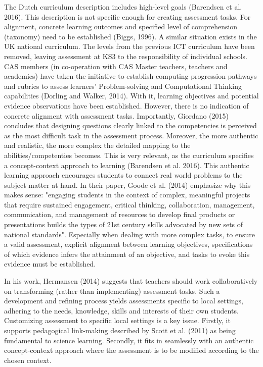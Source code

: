 The Dutch curriculum description includes high-level goals (Barendsen et al. 2016). This description is not specific enough for creating assessment tasks. For alignment, concrete learning outcomes and specified level of comprehension (taxonomy) need to be established (Biggs, 1996). A similar situation exists in the UK national curriculum. The levels from the previous ICT curriculum have been removed, leaving assessment at KS3 to the responsibility of individual schools. CAS members (in co-operation with CAS Master teachers, teachers and academics) have taken the initiative to establish computing progression pathways and rubrics to assess learners' Problem-solving and Computational Thinking capabilities (Dorling and Walker, 2014). With it, learning objectives and potential evidence observations have been established. However, there is no indication of concrete alignment with assessment tasks. Importantly, Giordano (2015) concludes that designing questions clearly linked to the competencies is perceived as the most difficult task in the assessment process. Moreover, the more authentic and realistic, the more complex the detailed mapping to the abilities/competenties becomes. This is very relevant, as the curriculum specifies a concept-context approach to learning (Barendsen et al. 2016). This authentic learning approach encourages students to connect real world problems to the subject matter at hand. In their paper, Goode et al. (2014) emphasize why this makes sense: "engaging students in the context of complex, meaningful projects that require sustained engagement, critical thinking, collaboration, management, communication, and management of resources to develop final products or presentations builds the types of 21st century skills advocated by new sets of national standards". Especially when dealing with more complex tasks, to ensure a valid assessment, explicit alignment between learning objectives, specifications of which evidence infers the attainment of an objective, and tasks to evoke this evidence must be established.


In his work, Hermansen (2014) suggests that teachers should work collaboratively on transforming (rather than implementing) assessment tasks. Such a development and refining process yields assessments specific to local settings, adhering to the needs, knowledge, skills and interests of their own students. Customizing assessment to specific local settings is a key issue. Firstly, it supports pedagogical link-making described by Scott et al. (2011) as being fundamental to science learning. Secondly, it fits in seamlessly with an authentic concept-context approach where the assessment is to be modified according to the chosen context.


